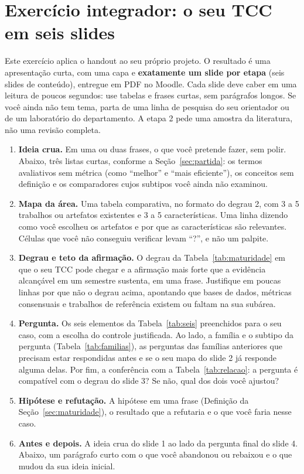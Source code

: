 \documentclass[10pt,a4paper]{extarticle}
\theoremstyle{definition}
\begin{document}
\section*{Exercício integrador: o seu TCC em seis slides}

Este exercício aplica o handout ao seu próprio projeto. O resultado é uma apresentação curta, com uma capa e \textbf{exatamente um slide por etapa} (seis slides de conteúdo), entregue em PDF no Moodle. Cada slide deve caber em uma leitura de poucos segundos: use tabelas e frases curtas, sem parágrafos longos. Se você ainda não tem tema, parta de uma linha de pesquisa do seu orientador ou de um laboratório do departamento. A etapa 2 pede uma amostra da literatura, não uma revisão completa.

\begin{enumerate}[label=\textbf{Slide \arabic*.}, leftmargin=*, itemsep=0.6em]
  \item \textbf{Ideia crua.} Em uma ou duas frases, o que você pretende fazer, sem polir. Abaixo, três listas curtas, conforme a Seção~\ref{sec:partida}: os termos avaliativos sem métrica (como \enquote{melhor} e \enquote{mais eficiente}), os conceitos sem definição e os comparadores cujos subtipos você ainda não examinou.
  \item \textbf{Mapa da área.} Uma tabela comparativa, no formato do degrau 2, com 3 a 5 trabalhos ou artefatos existentes e 3 a 5 características. Uma linha dizendo como você escolheu os artefatos e por que as características são relevantes. Células que você não conseguiu verificar levam \enquote{?}, e não um palpite.
  \item \textbf{Degrau e teto da afirmação.} O degrau da Tabela~\ref{tab:maturidade} em que o seu TCC pode chegar e a afirmação mais forte que a evidência alcançável em um semestre sustenta, em uma frase. Justifique em poucas linhas por que não o degrau acima, apontando que bases de dados, métricas consensuais e trabalhos de referência existem ou faltam na sua subárea.
  \item \textbf{Pergunta.} Os seis elementos da Tabela~\ref{tab:seis} preenchidos para o seu caso, com a escolha do controle justificada. Ao lado, a família e o subtipo da pergunta (Tabela~\ref{tab:familias}), as perguntas das famílias anteriores que precisam estar respondidas antes e se o seu mapa do slide 2 já responde alguma delas. Por fim, a conferência com a Tabela~\ref{tab:relacao}: a pergunta é compatível com o degrau do slide 3? Se não, qual dos dois você ajustou?
  \item \textbf{Hipótese e refutação.} A hipótese em uma frase (Definição da Seção~\ref{sec:maturidade}), o resultado que a refutaria e o que você faria nesse caso.
  \item \textbf{Antes e depois.} A ideia crua do slide 1 ao lado da pergunta final do slide 4. Abaixo, um parágrafo curto com o que você abandonou ou rebaixou e o que mudou da sua ideia inicial.
\end{enumerate}
\end{document}
